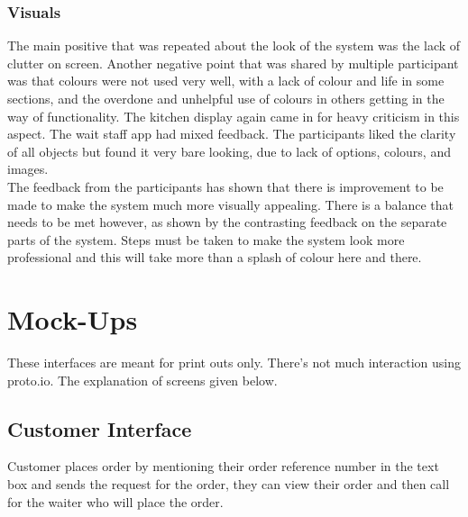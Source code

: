 \documentclass[11pt, a4paper]{report}
\begin{document}
\subsubsection{Visuals} 
The   main   positive   that   was   repeated   about   the   look   of   the   system   was   the   lack   of clutter   on   screen.   Another   negative   point   that   was   shared   by   multiple   participant was   that   colours   were   not   used   very   well,   with   a   lack   of   colour   and   life   in   some sections,   and   the   overdone   and   unhelpful   use   of   colours   in   others   getting   in   the way   of   functionality.   The   kitchen   display   again   came   in   for   heavy   criticism   in   this aspect.   The   wait   staff   app   had   mixed   feedback.   The   participants   liked   the   clarity   of all   objects   but   found   it   very   bare   looking,   due   to   lack   of   options,   colours,   and images.\\
The   feedback   from   the   participants   has   shown   that   there   is   improvement   to   be made   to   make   the   system   much   more   visually   appealing.   There   is   a   balance   that needs   to   be   met   however,   as   shown   by   the   contrasting   feedback   on   the   separate parts   of   the   system.   Steps   must   be   taken   to   make   the   system   look   more professional   and   this   will   take   more   than   a   splash   of   colour   here   and   there.\\

\section{Mock-Ups}
These interfaces are meant for print outs only. There’s not much interaction using proto.io. The explanation of screens given below.\\
\subsection{Customer Interface} 
Customer places order by mentioning their order reference number in the text box and sends the request for the order, they can view their order and then call for the waiter who will place the order.\\
\end{document}
